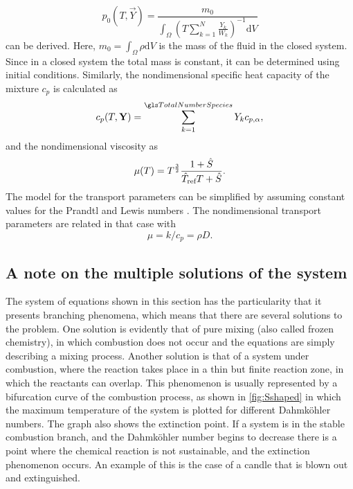 \begin{equation}
	p_0(T, \vec{Y}) = \frac{m_0}{\int_\Omega \left( T\sum_{k=1}^{N} \frac{Y_k}{W_k} \right)^{-1}\text{d}V} \label{eq:p0Condition}
\end{equation}
can be derived. Here, $m_0 = \int_\Omega \rho \text{d}V$ is the mass of the fluid in the closed system. Since in a closed system the total mass is constant, it can be determined using initial conditions.
Similarly, the nondimensional specific heat capacity of the mixture $c_p$ is calculated as
\begin{equation}\label{eq:nondim_cpmixture}
	c_p(T,\mathbf{Y}) = \SumOvAllns Y_k c_{p,\alpha},
\end{equation}
and the nondimensional viscosity as
\begin{equation} \label{eq:nondim_sutherland}
	\mu(T) =  T^{\frac{3}{2}}\frac{1+\hat{S} }{\hat T_{\text{ref}}T+\hat{S}}.
\end{equation}
The model for the transport parameters can be simplified by assuming constant values for the Prandtl and Lewis numbers \parencite{smokeFormulationPremixedNonpremixed1991}.  The nondimensional transport parameters are related in that case with 
\begin{equation}
    \mu = k/c_p = \rho D.
\end{equation}
\subsection{A note on the multiple solutions of the system}
The system of equations shown in this section has the particularity that it presents branching phenomena, which means that there are several solutions to the problem. One solution is evidently that of pure mixing (also called frozen chemistry), in which combustion does not occur and the equations are simply describing a mixing process. Another solution is that of a system under combustion, where the reaction takes place in a thin but finite reaction zone, in which the reactants can overlap. This phenomenon is usually represented by a bifurcation curve of the combustion process, as shown in \cref{fig:Sshaped} in which the maximum temperature of the system is plotted for different Dahmköhler numbers. 
The graph also shows the extinction point. If a system is in the stable combustion branch, and the Dahmköhler number begins to decrease there is a point where the chemical reaction is not sustainable, and the extinction phenomenon occurs. An example of this is the case of a candle that is blown out and extinguished.

